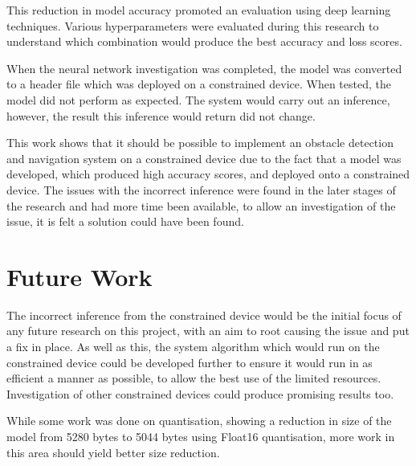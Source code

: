 \documentclass{svproc}
\begin{document}
This reduction in model accuracy promoted an evaluation using deep learning techniques. Various hyperparameters were evaluated during this 
research to understand which combination would produce the best accuracy and loss scores. 

When the neural network investigation was completed, the model was converted to a header file which was deployed on a constrained device. 
When tested, the model did not perform as expected. The system would carry out an inference, however, the result this inference would return did not change.

This work shows that it should be possible to implement an obstacle detection and navigation system on a constrained device due to the fact 
that a model was developed, which produced high accuracy scores, and deployed onto a constrained device. The issues with the incorrect inference 
were found in the later stages of the research and had more time been available, to allow an investigation of the issue, it is felt a solution 
could have been found.

\section{Future Work}
The incorrect inference from the constrained device would be the initial focus of any future research on this project, with an aim to root 
causing the issue and put a fix in place. As well as this, the system algorithm which would run on the constrained device could be developed 
further to ensure it would run in as efficient a manner as possible, to allow the best use of the limited resources. Investigation of other 
constrained devices could produce promising results too. 

While some work was done on quantisation, showing a reduction in size of the model from 5280 bytes to 5044 bytes using Float16 quantisation, 
more work in this area should yield better size reduction.
\end{document}
